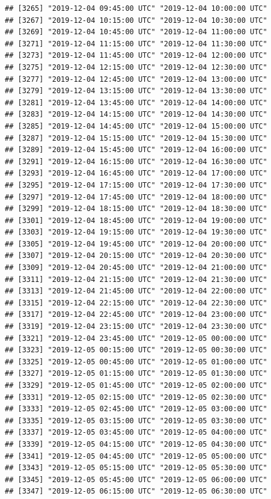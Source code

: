 \documentclass{article}\usepackage[]{graphicx}\usepackage[]{color}
\makeatletter
\newenvironment{kframe}{%
 \def\at@end@of@kframe{}%
 \ifinner\ifhmode%
  \def\at@end@of@kframe{\end{minipage}}%
  \begin{minipage}{\columnwidth}%
 \fi\fi%
 \def\FrameCommand##1{\hskip\@totalleftmargin \hskip-\fboxsep
 \colorbox{shadecolor}{##1}\hskip-\fboxsep
     \hskip-\linewidth \hskip-\@totalleftmargin \hskip\columnwidth}%
 \MakeFramed {\advance\hsize-\width
   \@totalleftmargin\z@ \linewidth\hsize
   \@setminipage}}%
 {\par\unskip\endMakeFramed%
 \at@end@of@kframe}
\newenvironment{knitrout}{}{} %
\makeatother
\begin{document}
\begin{knitrout}
\begin{kframe}
\begin{verbatim}
## [3265] "2019-12-04 09:45:00 UTC" "2019-12-04 10:00:00 UTC"
## [3267] "2019-12-04 10:15:00 UTC" "2019-12-04 10:30:00 UTC"
## [3269] "2019-12-04 10:45:00 UTC" "2019-12-04 11:00:00 UTC"
## [3271] "2019-12-04 11:15:00 UTC" "2019-12-04 11:30:00 UTC"
## [3273] "2019-12-04 11:45:00 UTC" "2019-12-04 12:00:00 UTC"
## [3275] "2019-12-04 12:15:00 UTC" "2019-12-04 12:30:00 UTC"
## [3277] "2019-12-04 12:45:00 UTC" "2019-12-04 13:00:00 UTC"
## [3279] "2019-12-04 13:15:00 UTC" "2019-12-04 13:30:00 UTC"
## [3281] "2019-12-04 13:45:00 UTC" "2019-12-04 14:00:00 UTC"
## [3283] "2019-12-04 14:15:00 UTC" "2019-12-04 14:30:00 UTC"
## [3285] "2019-12-04 14:45:00 UTC" "2019-12-04 15:00:00 UTC"
## [3287] "2019-12-04 15:15:00 UTC" "2019-12-04 15:30:00 UTC"
## [3289] "2019-12-04 15:45:00 UTC" "2019-12-04 16:00:00 UTC"
## [3291] "2019-12-04 16:15:00 UTC" "2019-12-04 16:30:00 UTC"
## [3293] "2019-12-04 16:45:00 UTC" "2019-12-04 17:00:00 UTC"
## [3295] "2019-12-04 17:15:00 UTC" "2019-12-04 17:30:00 UTC"
## [3297] "2019-12-04 17:45:00 UTC" "2019-12-04 18:00:00 UTC"
## [3299] "2019-12-04 18:15:00 UTC" "2019-12-04 18:30:00 UTC"
## [3301] "2019-12-04 18:45:00 UTC" "2019-12-04 19:00:00 UTC"
## [3303] "2019-12-04 19:15:00 UTC" "2019-12-04 19:30:00 UTC"
## [3305] "2019-12-04 19:45:00 UTC" "2019-12-04 20:00:00 UTC"
## [3307] "2019-12-04 20:15:00 UTC" "2019-12-04 20:30:00 UTC"
## [3309] "2019-12-04 20:45:00 UTC" "2019-12-04 21:00:00 UTC"
## [3311] "2019-12-04 21:15:00 UTC" "2019-12-04 21:30:00 UTC"
## [3313] "2019-12-04 21:45:00 UTC" "2019-12-04 22:00:00 UTC"
## [3315] "2019-12-04 22:15:00 UTC" "2019-12-04 22:30:00 UTC"
## [3317] "2019-12-04 22:45:00 UTC" "2019-12-04 23:00:00 UTC"
## [3319] "2019-12-04 23:15:00 UTC" "2019-12-04 23:30:00 UTC"
## [3321] "2019-12-04 23:45:00 UTC" "2019-12-05 00:00:00 UTC"
## [3323] "2019-12-05 00:15:00 UTC" "2019-12-05 00:30:00 UTC"
## [3325] "2019-12-05 00:45:00 UTC" "2019-12-05 01:00:00 UTC"
## [3327] "2019-12-05 01:15:00 UTC" "2019-12-05 01:30:00 UTC"
## [3329] "2019-12-05 01:45:00 UTC" "2019-12-05 02:00:00 UTC"
## [3331] "2019-12-05 02:15:00 UTC" "2019-12-05 02:30:00 UTC"
## [3333] "2019-12-05 02:45:00 UTC" "2019-12-05 03:00:00 UTC"
## [3335] "2019-12-05 03:15:00 UTC" "2019-12-05 03:30:00 UTC"
## [3337] "2019-12-05 03:45:00 UTC" "2019-12-05 04:00:00 UTC"
## [3339] "2019-12-05 04:15:00 UTC" "2019-12-05 04:30:00 UTC"
## [3341] "2019-12-05 04:45:00 UTC" "2019-12-05 05:00:00 UTC"
## [3343] "2019-12-05 05:15:00 UTC" "2019-12-05 05:30:00 UTC"
## [3345] "2019-12-05 05:45:00 UTC" "2019-12-05 06:00:00 UTC"
## [3347] "2019-12-05 06:15:00 UTC" "2019-12-05 06:30:00 UTC"

\end{verbatim}
\end{kframe}
\end{knitrout}
\end{document}
